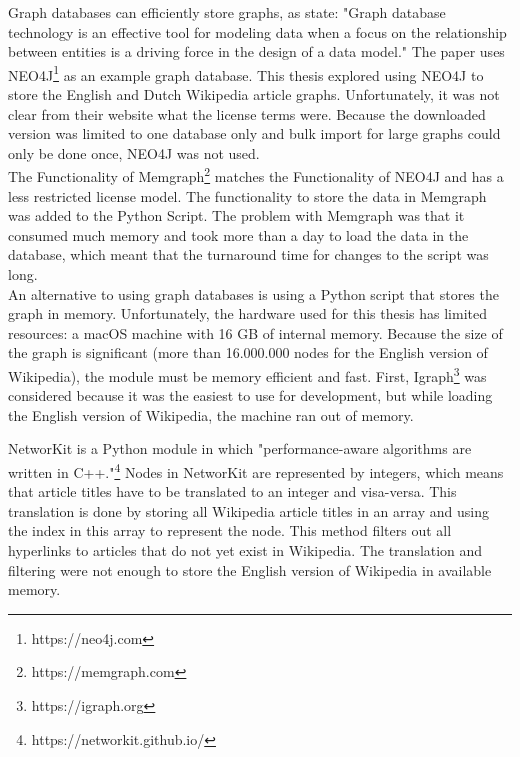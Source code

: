 Graph databases can efficiently store graphs, as \citet{neo4j} state: "Graph database technology is an effective tool for modeling data when a focus on the relationship between entities is a driving force in the design of a data model." The paper uses NEO4J\footnote{https://neo4j.com} as an example graph database. This thesis explored using NEO4J to store the English and Dutch Wikipedia article graphs. Unfortunately, it was not clear from their website what the license terms were. Because the downloaded version was limited to one database only and bulk import for large graphs could only be done once, NEO4J was not used. \\
The Functionality of Memgraph\footnote{https://memgraph.com} matches the Functionality of NEO4J and has a less restricted license model. The functionality to store the data in Memgraph was added to the Python Script. The problem with Memgraph was that it consumed much memory and took more than a day to load the data in the database, which meant that the turnaround time for changes to the script was long.\\

An alternative to using graph databases is using a Python script that stores the graph in memory. Unfortunately, the hardware used for this thesis has limited resources: a macOS machine with 16 GB of internal memory. Because the size of the graph is significant (more than 16.000.000 nodes for the English version of Wikipedia), the module must be memory efficient and fast. First, Igraph\footnote{https://igraph.org} was considered because it was the easiest to use for development, but while loading the English version of Wikipedia, the machine ran out of memory.

NetworKit is a Python module in which "performance-aware algorithms are written in C++."\footnote{https://networkit.github.io/} Nodes in NetworKit are represented by integers, which means that article titles have to be translated to an integer and visa-versa. This translation is done by storing all Wikipedia article titles in an array and using the index in this array to represent the node. This method filters out all hyperlinks to articles that do not yet exist in Wikipedia. The translation and filtering were not enough to store the English version of Wikipedia in available memory. \\

